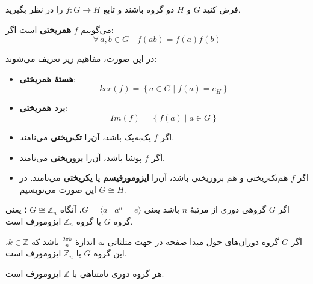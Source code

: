 \begin{frame}
    \footnotesize
    \begin{definition}[همریختی ]
        فرض کنید $G$ و $H$ دو گروه باشند و تابع $f \colon G \to H$ را در نظر بگیرید.

        می‌گوییم $f$ \textbf{همریختی} است اگر:
        \[
            \forall\, a,b \in G \quad f(ab) = f(a)f(b)
        \]

        در این صورت، مفاهیم زیر تعریف می‌شوند:

        \begin{itemize}
            \item \textbf{هستهٔ همریختی}:
                  \[
                      ker (f) = \left\{ a \in G \mid f(a) = e_H \right\}
                  \]

            \item \textbf{برد همریختی}:
                  \[
                      Im (f) = \left\{ f(a) \mid a \in G \right\}
                  \]

            \item اگر $f$ یک‌به‌یک باشد، آن‌را \textbf{تک‌ریختی}  می‌نامند.

            \item اگر $f$ پوشا باشد، آن‌را \textbf{برو‌ریختی}  می‌نامند.

            \item اگر $f$ هم‌تک‌ریختی و هم برو‌ریختی باشد، آن‌را \textbf{ایزومورفیسم} یا \textbf{یکریختی}  می‌نامند. در این صورت می‌نویسیم $G \cong H$.

        \end{itemize}
    \end{definition}
\end{frame}


\begin{frame}
    \begin{example}
        اگر $G$ گروهی دوری از مرتبهٔ $n$ باشد یعنی $G = \langle a \mid a^n = e \rangle$، آنگاه $G \cong \mathbb{Z}_n$ ؛ یعنی گروه $G$ با گروه $\mathbb{Z}_n$ ایزومورف است.
    \end{example}

    \begin{example}
        اگر $G$ گروه دوران‌های حول مبدا صفحه در جهت مثلثاتی به اندازهٔ $\frac{2\pi k}{n}$ باشد که $k \in \mathbb{Z}$، این گروه $G$ با $\mathbb{Z}_n$ ایزومورف است.
    \end{example}

    \begin{example}
        هر گروه دوری نامتناهی با $\mathbb{Z}$ ایزومورف است.
    \end{example}

\end{frame}

